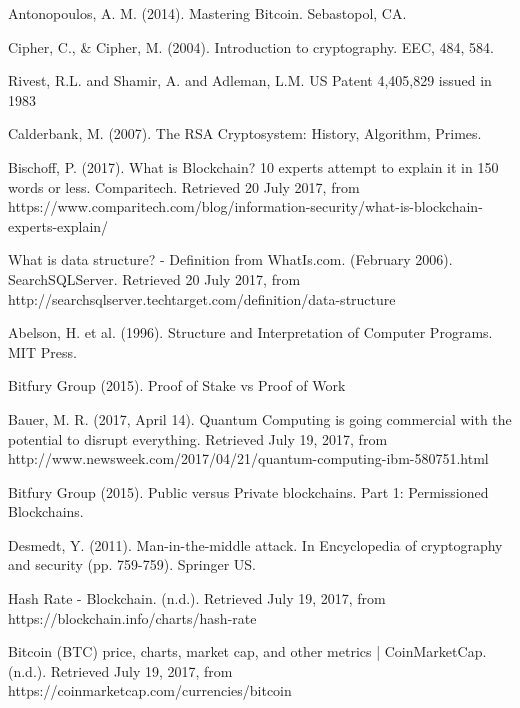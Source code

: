 \begin{thebibliography}{99}



{\sc Antonopoulos, A. M.} (2014).
Mastering Bitcoin.
{\em} Sebastopol, CA.

Cipher, C., \& Cipher, M. (2004). Introduction to cryptography. EEC, 484, 584.

Rivest, R.L. and Shamir, A. and Adleman, L.M. US Patent 4,405,829 issued in 1983

Calderbank, M. (2007). The RSA Cryptosystem: History, Algorithm, Primes.

Bischoff, P. (2017). What is Blockchain? 10 experts attempt to explain it in 150 words or less. Comparitech. Retrieved 20 July 2017, from https://www.comparitech.com/blog/information-security/what-is-blockchain-experts-explain/

What is data structure? - Definition from WhatIs.com. (February 2006). SearchSQLServer. Retrieved 20 July 2017, from http://searchsqlserver.techtarget.com/definition/data-structure

{\sc Abelson, H. et al.} (1996).
Structure and Interpretation of Computer Programs.
MIT Press.

Bitfury Group (2015). Proof of Stake vs Proof of Work

Bauer, M. R. (2017, April 14). Quantum Computing is going commercial with the potential to disrupt everything. Retrieved July 19, 2017, from http://www.newsweek.com/2017/04/21/quantum-computing-ibm-580751.html

Bitfury Group (2015). Public versus Private blockchains. Part 1: Permissioned Blockchains.

Desmedt, Y. (2011). Man-in-the-middle attack. In Encyclopedia of cryptography and security (pp. 759-759). Springer US.

Hash Rate - Blockchain. (n.d.). Retrieved July 19, 2017, from https://blockchain.info/charts/hash-rate

Bitcoin (BTC) price, charts, market cap, and other metrics | CoinMarketCap. (n.d.). Retrieved July 19, 2017, from https://coinmarketcap.com/currencies/bitcoin


\end{thebibliography}
